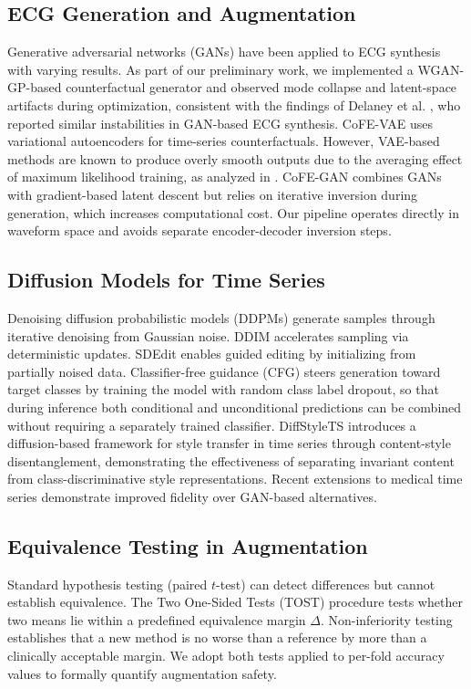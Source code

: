 \documentclass[conference]{IEEEtran}
\begin{document}
\subsection{ECG Generation and Augmentation}
Generative adversarial networks (GANs) \cite{goodfellow2014} have been applied to ECG synthesis with varying results. As part of our preliminary work, we implemented a WGAN-GP-based \cite{gulrajani2017} counterfactual generator and observed mode collapse and latent-space artifacts during optimization, consistent with the findings of Delaney et al. \cite{delaney2019}, who reported similar instabilities in GAN-based ECG synthesis. CoFE-VAE \cite{nemirovsky2021} uses variational autoencoders for time-series counterfactuals. However, VAE-based methods are known to produce overly smooth outputs due to the averaging effect of maximum likelihood training, as analyzed in \cite{bredell2023}. CoFE-GAN \cite{jang2025cofe} combines GANs with gradient-based latent descent but relies on iterative inversion during generation, which increases computational cost. Our pipeline operates directly in waveform space and avoids separate encoder-decoder inversion steps.

\subsection{Diffusion Models for Time Series}
Denoising diffusion probabilistic models (DDPMs) \cite{ho2020} generate samples through iterative denoising from Gaussian noise. DDIM \cite{song2021ddim} accelerates sampling via deterministic updates. SDEdit \cite{meng2022sdedit} enables guided editing by initializing from partially noised data. Classifier-free guidance (CFG) \cite{ho2022classifier} steers generation toward target classes by training the model with random class label dropout, so that during inference both conditional and unconditional predictions can be combined without requiring a separately trained classifier. DiffStyleTS \cite{nagda2025diffstylts} introduces a diffusion-based framework for style transfer in time series through content-style disentanglement, demonstrating the effectiveness of separating invariant content from class-discriminative style representations. Recent extensions to medical time series \cite{alcaraz2023diffusion} demonstrate improved fidelity over GAN-based alternatives.

\subsection{Equivalence Testing in Augmentation}
Standard hypothesis testing (paired $t$-test) can detect differences but cannot establish equivalence. The Two One-Sided Tests (TOST) procedure \cite{schuirmann1987comparison} tests whether two means lie within a predefined equivalence margin $\Delta$. Non-inferiority testing \cite{walker2011understanding} establishes that a new method is no worse than a reference by more than a clinically acceptable margin. We adopt both tests applied to per-fold accuracy values to formally quantify augmentation safety.
\end{document}

